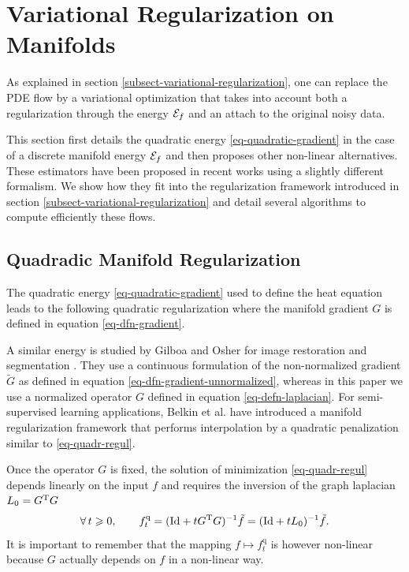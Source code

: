 \documentclass[final]{siamltex}
\newcommand{\quadra}{\text{q}}
\newcommand{\F}{f}
\newcommand{\tF}{\tilde \F}
\begin{document}
\section{Variational Regularization on Manifolds}
\label{sect-variational-regularization}

As explained in section \ref{subsect-variational-regularization}, one can replace the PDE flow by a variational optimization that takes into account both a regularization through the energy $\energy_{\F}$ and an attach to the original noisy data. 

This section first details the quadratic energy \eqref{eq-quadratic-gradient} in the case of a discrete manifold energy $\energy_{\F}$ and then proposes other non-linear alternatives. These estimators have been proposed in recent works using a slightly different formalism. We show how they fit into the regularization framework introduced in section \ref{subsect-variational-regularization} and detail several algorithms to compute efficiently these flows.

\subsection{Quadradic Manifold Regularization}
\label{subsect-quad-regularization}

The quadratic energy \eqref{eq-quadratic-gradient} used to define the heat equation leads to the following quadratic regularization 
\eql{
	\label{eq-quadr-regul}
	\foralls t\geq 0, \qquad \F_t^{\quadra} = \uargmin{g \in \ldeux(\Mm)} \norm{\tF-g}_{\ldeux}^2 + t \norm{ G g }_{\ldeux}^2
}
where the manifold gradient $G$ is defined in equation \eqref{eq-dfn-gradient}. 

A similar energy is studied by Gilboa and Osher for image restoration and segmentation \cite{gilboa-nonlocal-segmentation}. They use a continuous formulation of the non-normalized gradient $\tilde G$ as defined in equation \eqref{eq-dfn-gradient-unnormalized}, whereas in this paper we use a normalized operator $G$ defined in equation \eqref{eq-defn-laplacian}. For semi-supervised learning applications, Belkin et al. \cite{belkin-manifold-regularization} have introduced a manifold regularization framework that performs interpolation by a quadratic penalization similar to \eqref{eq-quadr-regul}.

Once the operator $G$ is fixed, the solution of minimization \eqref{eq-quadr-regul} depends linearly on the input $\F$ and requires the inversion of the graph laplacian $L_0 = {G}^{\mathrm{T}}G$
\begin{equation*}
	\foralls t\geq 0, \qquad \F_t^{\quadra} = (\Id+t \transp{G}G)^{-1} \tF = (\Id+t L_0)^{-1} \tF.
\end{equation*}
It is important to remember that the mapping $\F \mapsto \F_t^{\quadra}$ is however non-linear because $G$ actually depends on $\F$ in a non-linear way.
\end{document}
